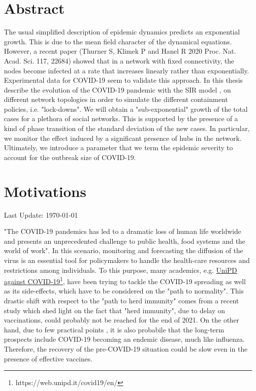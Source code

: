 \documentclass[a4paper,10pt, oneside]{book} %
\theoremstyle{definition}
\begin{document}

\restoregeometry
\chapter{Abstract}
The usual simplified description of epidemic dynamics predicts an exponential growth. This is due to the mean field character of the dynamical equations. However, a recent paper (Thurner S, Klimek P and Hanel R 2020 Proc. Nat. Acad. Sci. 117, 22684) \cite{Thurner::NetBasedExpl} showed that in a network with fixed connectivity, the nodes become infected at a rate that increases linearly rather than exponentially.
Experimental data for COVID-19 seem to validate this approach. In this thesis describe the evolution of the COVID-19 pandemic with the SIR model \cite{pizzuti::2020_ItalyCOVIDnetwork}, on different network topologies in order to simulate the different containment policies, i.e. "lock-downs". We will obtain a "sub-exponential" growth of the total cases for a plethora of social networks. This is supported by the presence of a kind of phase transition of the standard deviation of the new cases. In particular, we monitor the effect induced by a significant presence of hubs in the network.
Ultimately, we introduce a parameter that we term the epidemic severity to account for the outbreak size of COVID-19.

\chapter{Motivations}
Last Update: \today

"The COVID-19 pandemics has led to a dramatic loss of human life worldwide and presents an unprecedented challenge to public health, food systems and the world of work"\cite{Chriscaden::2021_ImpactCOVID19}. In this scenario, monitoring and forecasting the diffusion of the virus is an essential tool for policymakers to handle the health-care resources and restrictions among individuals. To this purpose, many academics, e.g. \href{https://web.unipd.it/covid19/en/}{UniPD against COVID-19}\footnote{https://web.unipd.it/covid19/en/}, have been trying to tackle the COVID-19 spreading as well as its side-effects, which have to be considered on the "path to normality". This drastic shift with respect to the "path to herd immunity" comes from a recent study \cite{GU::2021_SitePathToNormality} which shed light on the fact that "herd immunity", due to delay on vaccinations, could probably not be reached for the end of 2021. On the other hand, due to few practical points \cite{Nature:18.3.2021_NoHerdImmunity}, it is also probabile that the long-term prospects include COVID-19 becoming an endemic disease, much like influenza. 
Therefore, the recovery of the pre-COVID-19 situation could be slow even in the presence of effective vaccines.
\end{document}

